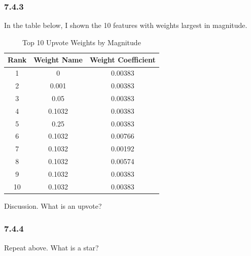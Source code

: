 \documentclass[12pt]{amsart}
\begin{document}
\subsubsection*{7.4.3}

In the table below, I shown the 10 features with weights largest in magnitude.

\begin{table}
	\centering
	\caption{Top 10 Upvote Weights by Magnitude}
	\begin{tabular}{ccc} 
		\hline
		Rank & Weight Name & Weight Coefficient \\
		\hline
		1 & 0 & 0.00383 \\
		2 & 0.001 & 0.00383 \\
		3 & 0.05 & 0.00383 \\
		4 & 0.1032 & 0.00383 \\
		5 & 0.25 & 0.00383  \\ 
		6 & 0.1032 & 0.00766  \\
		7 & 0.1032 & 0.00192  \\
		8 & 0.1032 & 0.00574  \\
		9 & 0.1032 & 0.00383 \\
		10 & 0.1032 & 0.00383 \\
		\hline
	\end{tabular}
	\label{tab:top_upvotes}
\end{table}

Discussion.  What is an upvote?

\subsubsection*{7.4.4}

Repeat above.  What is a star?
\end{document}
